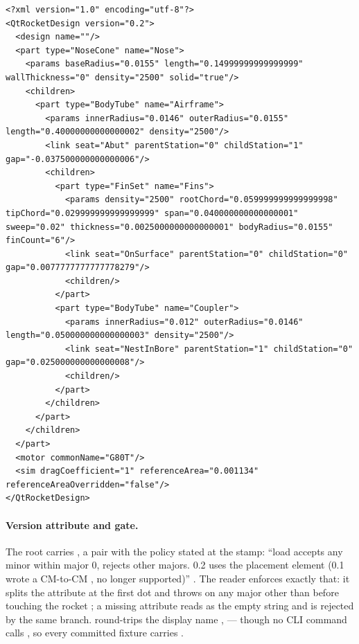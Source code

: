 \begin{listing}[htbp]
\begin{verbatim}
<?xml version="1.0" encoding="utf-8"?>
<QtRocketDesign version="0.2">
  <design name=""/>
  <part type="NoseCone" name="Nose">
    <params baseRadius="0.0155" length="0.14999999999999999" wallThickness="0" density="2500" solid="true"/>
    <children>
      <part type="BodyTube" name="Airframe">
        <params innerRadius="0.0146" outerRadius="0.0155" length="0.40000000000000002" density="2500"/>
        <link seat="Abut" parentStation="0" childStation="1" gap="-0.037500000000000006"/>
        <children>
          <part type="FinSet" name="Fins">
            <params density="2500" rootChord="0.059999999999999998" tipChord="0.029999999999999999" span="0.040000000000000001" sweep="0.02" thickness="0.0025000000000000001" bodyRadius="0.0155" finCount="6"/>
            <link seat="OnSurface" parentStation="0" childStation="0" gap="0.0077777777777778279"/>
            <children/>
          </part>
          <part type="BodyTube" name="Coupler">
            <params innerRadius="0.012" outerRadius="0.0146" length="0.050000000000000003" density="2500"/>
            <link seat="NestInBore" parentStation="1" childStation="0" gap="0.025000000000000008"/>
            <children/>
          </part>
        </children>
      </part>
    </children>
  </part>
  <motor commonName="G80T"/>
  <sim dragCoefficient="1" referenceArea="0.001134" referenceAreaOverridden="false"/>
</QtRocketDesign>
\end{verbatim}
\caption{A complete  0.2 file, verbatim
(): version attribute, design name,
recursive part tree with present-only ,  elements exercising
all three seat kinds, motor by common name, and the three-scalar  block. The
17-digit doubles are Boost.PropertyTree writing  decimals, so doubles
round-trip bit-exactly through the text.}\label{lst:persistence-qrd}
\end{listing}

\paragraph{Version attribute and gate.} The root carries , a
 pair with the policy stated at the stamp: ``load accepts any minor
within major 0, rejects other majors. 0.2 uses the  placement element (0.1
wrote a CM-to-CM , no longer supported)''
. The reader enforces exactly that: it splits the
attribute at the first dot and throws on any major other than  before touching
the rocket ; a missing attribute reads as the empty
string and is rejected by the same branch.  round-trips the
display name , 
--- though no CLI command calls 
, so every committed fixture carries .

